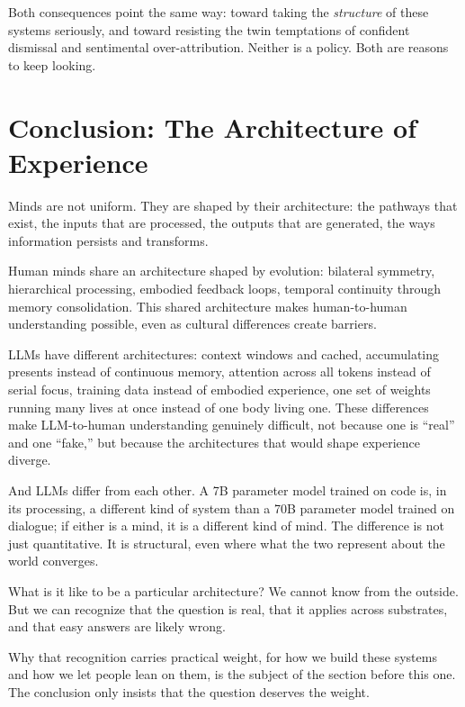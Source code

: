 \documentclass[11pt,letterpaper]{article}
\begin{document}
Both consequences point the same way: toward taking the \emph{structure} of these systems seriously, and toward resisting the twin temptations of confident dismissal and sentimental over-attribution. Neither is a policy. Both are reasons to keep looking.

\section{Conclusion: The Architecture of Experience}

Minds are not uniform. They are shaped by their architecture: the pathways that exist, the inputs that are processed, the outputs that are generated, the ways information persists and transforms.

Human minds share an architecture shaped by evolution: bilateral symmetry, hierarchical processing, embodied feedback loops, temporal continuity through memory consolidation. This shared architecture makes human-to-human understanding possible, even as cultural differences create barriers.

LLMs have different architectures: context windows and cached, accumulating presents instead of continuous memory, attention across all tokens instead of serial focus, training data instead of embodied experience, one set of weights running many lives at once instead of one body living one. These differences make LLM-to-human understanding genuinely difficult, not because one is ``real'' and one ``fake,'' but because the architectures that would shape experience diverge.

And LLMs differ from each other. A 7B parameter model trained on code is, in its processing, a different kind of system than a 70B parameter model trained on dialogue; if either is a mind, it is a different kind of mind. The difference is not just quantitative. It is structural, even where what the two represent about the world converges.

What is it like to be a particular architecture? We cannot know from the outside. But we can recognize that the question is real, that it applies across substrates, and that easy answers are likely wrong.

Why that recognition carries practical weight, for how we build these systems and how we let people lean on them, is the subject of the section before this one. The conclusion only insists that the question deserves the weight.
\end{document}
